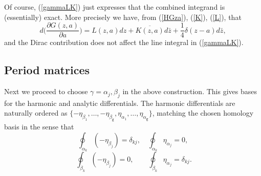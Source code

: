 \documentclass[reqno,12pt]{article}
\theoremstyle{plain}
\theoremstyle{definition}
\numberwithin{equation}{section}
\numberwithin{figure}{section}
\begin{document}
Of course, (\ref{gammaLK}) just expresses that the combined integrand is (essentially) exact.
More precisely we have, from (\ref{HGza}), (\ref{K}), (\ref{L}), that 
$$
d\big(\frac{\partial G(z,a)}{\partial a} \big)=L(z,a)dz+ \overline{K(z,a)}d\bar{z}+\frac{1}{4}\delta(z-a)d\bar{z},
$$
and the Dirac contribution does not affect the line integral in (\ref{gammaLK}). 


\subsection{Period matrices}\label{sec:period matrices}

Next we proceed to choose $\gamma=\alpha_j,\beta_j$ in the above construction. This gives bases for the harmonic and analytic differentials.  
The harmonic differentials are naturally ordered as
$\{-\eta_{\beta_1},\dots, -\eta_{\beta_\texttt{g}}, \eta_{\alpha_1}, \dots, \eta_{\alpha_\texttt{g}} \}$,
matching the chosen homology basis in the sense that
\begin{equation}\label{etaalpha}
\oint_{\alpha_k} (-\eta_{\beta_j})=\delta_{kj}, \quad \oint_{\alpha_k} \eta_{\alpha_j}=0,
\end{equation}
\begin{equation}\label{etabeta}
\ \oint_{\beta_k} (-\eta_{\beta_j})=0, \qquad \oint_{\beta_k} \eta_{\alpha_j}=\delta_{kj}. 
\end{equation}
\end{document}
